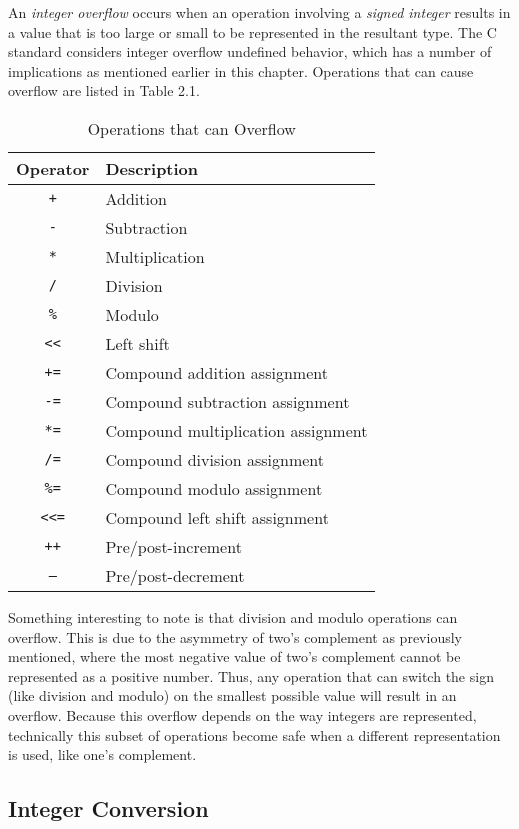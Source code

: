 An \textit{integer overflow} occurs when an operation involving a \textit{signed integer} results in a value that is too large or small to be represented in the resultant type. The C standard considers integer overflow undefined behavior, which has a number of implications as mentioned earlier in this chapter. Operations that can cause overflow are listed in Table 2.1.
\begin{table}[h!]
\centering
\begin{tabular}{|c|l|}
\hline
\textbf{Operator} & \textbf{Description} \\
\hline
\texttt{+}        & Addition \\
\texttt{-}        & Subtraction \\
\texttt{*}        & Multiplication \\
\texttt{/}        & Division \\
\texttt{\%}       & Modulo \\
\texttt{<<}       & Left shift\\
\hline
\texttt{+=}       & Compound addition assignment \\
\texttt{-=}       & Compound subtraction assignment \\
\texttt{*=}       & Compound multiplication assignment \\
\texttt{/=}       & Compound division assignment \\
\texttt{\%=}      & Compound modulo assignment \\
\texttt{<<=}      & Compound left shift assignment \\
\hline
\texttt{++}       & Pre/post-increment \\
\texttt{--}       & Pre/post-decrement \\
\hline
\end{tabular}
\caption{Operations that can Overflow}
\end{table}

Something interesting to note is that division and modulo operations can overflow. This is due to the asymmetry of two's complement as previously mentioned, where the most negative value of two's complement cannot be represented as a positive number. Thus, any operation that can switch the sign (like division and modulo) on the smallest possible value will result in an overflow. Because this overflow depends on the way integers are represented, technically this subset of operations become safe when a different representation is used, like one's complement.

\subsection{Integer Conversion}

